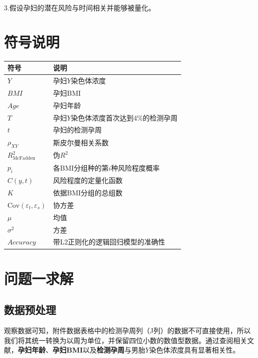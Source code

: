 \documentclass[12pt]{ctexart}
\begin{document}
	3.假设孕妇的潜在风险与时间相关并能够被量化。
	
	\section{符号说明}
	
	\begin{table}[H]
		\centering
		\setlength{\tabcolsep}{12pt} %
		\begin{tabular}{@{}ll@{}}
			\toprule
			符号 & 说明 \\ \midrule
			$Y$ & 孕妇$Y$染色体浓度 \\
			$BMI$ & 孕妇BMI \\
			$Age$ & 孕妇年龄 \\
			$T$ & 孕妇$Y$染色体浓度首次达到4\%的检测孕周 \\
			$t$ & 孕妇的检测孕周 \\
			$\rho_{XY}$ & 斯皮尔曼相关系数\\
			$	R^2_{\text{McFadden}}$ & \text{McFadden}伪$R^2$\\
			$p_i$ & 各BMI分组种的第$i$种风险程度概率 \\
			$C(y,t)$ & 风险程度的定量化函数\\
			$K$ & 依据BMI分组的总组数 \\ 
			$\mathrm{Cov}(\varepsilon_t,\varepsilon_s)$ & 协方差 \\
			$\mu$ & 均值 \\ 
			$\sigma^2$ & 方差 \\
			$Accuracy$ & 带L2正则化的逻辑回归模型的准确性\\
			\bottomrule
		\end{tabular}
	\end{table}
	
	\newpage
	
	\section{问题一求解}
	
	\subsection{数据预处理}
	
	
	观察数据可知，附件数据表格中的检测孕周列（J列）的数据不可直接使用，所以我们将其统一转换为以周为单位，并保留四位小数的数值型数据。通过查阅相关文献\cite{wang2013}，\textbf{孕妇年龄}、\textbf{孕妇BMI}以及\textbf{检测孕周}与男胎$Y$染色体浓度具有显著相关性。
	
\end{document}
